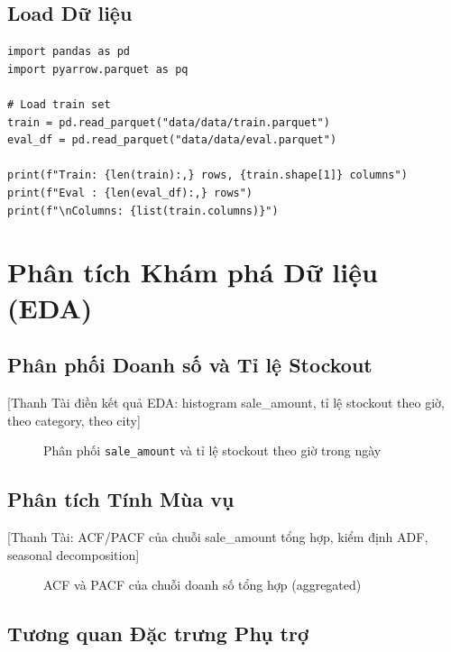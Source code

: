\documentclass[12pt,a4paper]{report}
\begin{document}
\subsection{Load Dữ liệu}

\begin{lstlisting}[caption=Load FreshRetailNet-50K]
import pandas as pd
import pyarrow.parquet as pq

# Load train set
train = pd.read_parquet("data/data/train.parquet")
eval_df = pd.read_parquet("data/data/eval.parquet")

print(f"Train: {len(train):,} rows, {train.shape[1]} columns")
print(f"Eval : {len(eval_df):,} rows")
print(f"\nColumns: {list(train.columns)}")
\end{lstlisting}

\section{Phân tích Khám phá Dữ liệu (EDA)}

\subsection{Phân phối Doanh số và Tỉ lệ Stockout}

[Thanh Tài điền kết quả EDA: histogram sale\_amount, tỉ lệ stockout theo giờ, theo category, theo city]

\begin{figure}[H]
    \centering
    \caption{Phân phối \texttt{sale\_amount} và tỉ lệ stockout theo giờ trong ngày}
\end{figure}

\subsection{Phân tích Tính Mùa vụ}

[Thanh Tài: ACF/PACF của chuỗi sale\_amount tổng hợp, kiểm định ADF, seasonal decomposition]

\begin{figure}[H]
    \centering
    \caption{ACF và PACF của chuỗi doanh số tổng hợp (aggregated)}
\end{figure}

\subsection{Tương quan Đặc trưng Phụ trợ}
\end{document}
